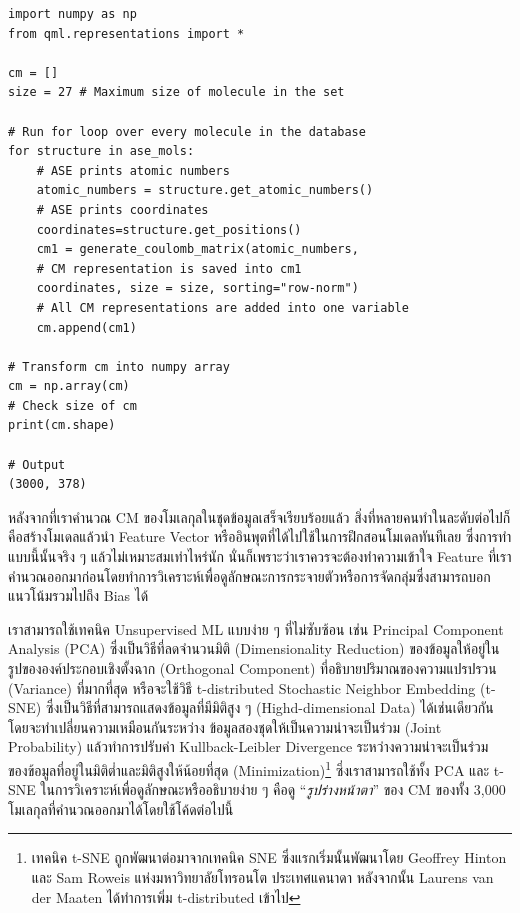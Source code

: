 \begin{lstlisting}[style=MyPython]
import numpy as np
from qml.representations import * 

cm = []
size = 27 # Maximum size of molecule in the set

# Run for loop over every molecule in the database
for structure in ase_mols: 
    # ASE prints atomic numbers 
    atomic_numbers = structure.get_atomic_numbers() 
    # ASE prints coordinates
    coordinates=structure.get_positions() 
    cm1 = generate_coulomb_matrix(atomic_numbers,
    # CM representation is saved into cm1
    coordinates, size = size, sorting="row-norm") 
    # All CM representations are added into one variable
    cm.append(cm1) 

# Transform cm into numpy array
cm = np.array(cm) 
# Check size of cm
print(cm.shape)

# Output
(3000, 378)
\end{lstlisting}

หลังจากที่เราคำนวณ CM ของโมเลกุลในชุดข้อมูลเสร็จเรียบร้อยแล้ว สิ่งที่หลายคนทำในละดับต่อไปก็คือสร้างโมเดลแล้วนำ Feature Vector 
หรืออินพุตที่ได้ไปใช้ในการฝึกสอนโมเดลทันทีเลย ซึ่งการทำแบบนี้นั้นจริง ๆ แล้วไม่เหมาะสมเท่าไหร่นัก นั่นก็เพราะว่าเราควรจะต้องทำความเข้าใจ 
Feature ที่เราคำนวณออกมาก่อนโดยทำการวิเคราะห์เพื่อดูลักษณะการกระจายตัวหรือการจัดกลุ่มซึ่งสามารถบอกแนวโน้มรวมไปถึง Bias ได้

เราสามารถใช้เทคนิค Unsupervised ML แบบง่าย ๆ ที่ไม่ซับซ้อน เช่น Principal Component Analysis (PCA) ซึ่งเป็นวิธีที่ลดจำนวนมิติ 
(Dimensionality Reduction) ของข้อมูลให้อยู่ในรูปขององค์ประกอบเชิงตั้งฉาก (Orthogonal Component) ที่อธิบายปริมาณของความแปรปรวน
(Variance) ที่มากที่สุด หรือจะใช้วิธี t-distributed Stochastic Neighbor Embedding (t-SNE) ซึ่งเป็นวิธีที่สามารถแสดงข้อมูลที่มีมิติสูง ๆ 
(Highd-dimensional Data) ได้เช่นเดียวกัน\autocite{JMLR:v9:vandermaaten08a,belkina2019} โดยจะทำเปลี่ยนความเหมือนกันระหว่าง%
ข้อมูลสองชุดให้เป็นความน่าจะเป็นร่วม (Joint Probability) แล้วทำการปรับค่า Kullback-Leibler Divergence ระหว่างความน่าจะเป็นร่วม%
ของข้อมูลที่อยู่ในมิติต่ำและมิติสูงให้น้อยที่สุด (Minimization)\footnote{เทคนิค t-SNE ถูกพัฒนาต่อมาจากเทคนิค SNE ซึ่งแรกเริ่มนั้นพัฒนาโดย
Geoffrey Hinton และ Sam Roweis แห่งมหาวิทยาลัยโทรอนโต ประเทศแคนาดา\autocite{NIPS2002_6150ccc6} หลังจากนั้น Laurens 
van der Maaten ได้ทำการเพิ่ม t-distributed เข้าไป} ซึ่งเราสามารถใช้ทั้ง PCA และ t-SNE ในการวิเคราะห์เพื่อดูลักษณะหรืออธิบายง่าย ๆ 
คือดู \enquote{\textit{รูปร่างหน้าตา}} ของ CM ของทั้ง 3,000 โมเลกุลที่คำนวณออกมาได้โดยใช้โค้ดต่อไปนี้

